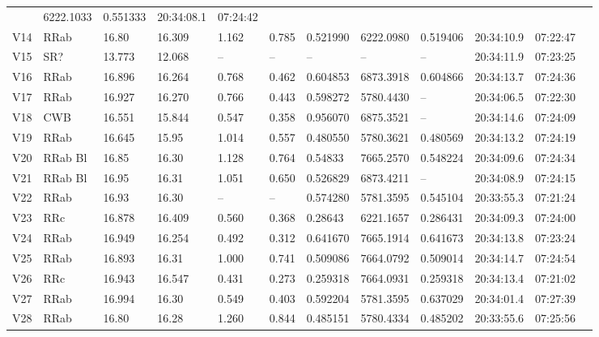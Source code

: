 \documentclass[journal]{rmaa}
\newcommand{\1}{\'{\i}}
\begin{document}
\begin{table*}
\begin{center}
\begin{tabular}{llllllllllll}
       & 6222.1033      & 0.551333  & 20:34:08.1  & 07:24:42\\
V14       & RRab      & 16.80  &16.309 &1.162  & 0.785  & 0.521990
       & 6222.0980   & 0.519406  & 20:34:10.9 &  07:22:47\\
V15       & SR?      & 13.773  &12.068 &--  &  --  & --
       & --     & --     & 20:34:11.9 & 07:23:25\\
V16       & RRab      & 16.896  &16.264 &0.768  & 0.462  & 0.604853
       & 6873.3918    & 0.604866    & 20:34:13.7 &  07:24:36\\
V17      & RRab    & 16.927 &16.270 & 0.766  & 0.443   &  0.598272
      & 5780.4430       & --   & 20:34:06.5  & 07:22:30\\
V18       & CWB    & 16.551  & 15.844 & 0.547    & 0.358   & 0.956070
       & 6875.3521      & --   & 20:34:14.6 &  07:24:09\\
V19       & RRab    & 16.645  &15.95 & 1.014    & 0.557   & 0.480550
       & 5780.3621       & 0.480569    & 20:34:13.2 &  07:24:19\\
V20       & RRab Bl   &16.85  & 16.30  & 1.128    & 0.764   & 0.54833
       & 7665.2570       & 0.548224     & 20:34:09.6 & 07:24:34\\
V21       & RRab Bl    & 16.95 & 16.31  &  1.051   & 0.650   &0.526829
        & 6873.4211     & --    & 20:34:08.9  & 07:24:15\\
V22       & RRab      & 16.93 & 16.30  & --    & --   &  0.574280
        & 5781.3595       & 0.545104    & 20:33:55.3 &  07:21:24\\
V23       & RRc     &16.878  &16.409 & 0.560  & 0.368   & 0.28643
       & 6221.1657     & 0.286431   & 20:34:09.3 & 07:24:00\\
V24       & RRab     &16.949  &16.254 & 0.492  & 0.312   & 0.641670
       & 7665.1914    & 0.641673  & 20:34:13.8 &  07:23:24\\
V25       & RRab    &16.893 & 16.31   &1.000   & 0.741  & 0.509086
       & 7664.0792    & 0.509014     & 20:34:14.7  & 07:24:54\\
V26       & RRc    &16.943   & 16.547  &0.431   & 0.273  & 0.259318
       & 7664.0931    & 0.259318     & 20:34:13.4  & 07:21:02\\
V27       & RRab    &16.994   & 16.30   &0.549   & 0.403  & 0.592204
       & 5781.3595    & 0.637029       &  20:34:01.4  & 07:27:39\\
V28       & RRab   &16.80   & 16.28  &  1.260  & 0.844  & 0.485151
        & 5780.4334     & 0.485202  & 20:33:55.6 &  07:25:56\\

\end{tabular}
\end{center}
\end{table*}
\end{document}
